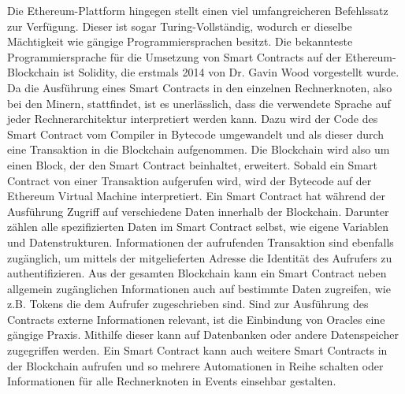 Die Ethereum-Plattform hingegen stellt einen viel umfangreicheren Befehlssatz
zur Verfügung. Dieser ist sogar Turing-Vollständig, wodurch er dieselbe Mächtigkeit wie gängige
Programmiersprachen besitzt.
Die bekannteste Programmiersprache für die Umsetzung von Smart Contracts auf der Ethereum-Blockchain 
ist Solidity, die erstmals 2014 von Dr. Gavin Wood vorgestellt wurde. Da die Ausführung eines Smart Contracts
in den einzelnen Rechnerknoten, also bei den Minern, stattfindet, ist es unerlässlich, 
dass die verwendete Sprache auf jeder Rechnerarchitektur interpretiert werden kann.
Dazu wird der Code des Smart Contract vom Compiler in 
Bytecode umgewandelt und als dieser durch eine Transaktion in die Blockchain 
aufgenommen. %
Die Blockchain wird also um einen Block, der den Smart Contract beinhaltet, erweitert.
Sobald ein Smart Contract von einer Transaktion aufgerufen wird, wird der Bytecode 
auf der Ethereum Virtual Machine interpretiert.
Ein Smart Contract hat während der Ausführung Zugriff auf verschiedene Daten innerhalb der 
Blockchain. 
Darunter zählen alle spezifizierten Daten im Smart Contract selbst, wie eigene Variablen
und Datenstrukturen. Informationen der aufrufenden Transaktion sind ebenfalls zugänglich, um 
mittels der mitgelieferten Adresse die Identität des Aufrufers
zu authentifizieren. Aus der gesamten Blockchain kann ein Smart Contract neben
allgemein zugänglichen Informationen auch auf bestimmte Daten zugreifen, wie z.B. 
Tokens die dem Aufrufer zugeschrieben sind.
Sind zur Ausführung des Contracts externe Informationen relevant, ist die Einbindung von Oracles
eine gängige Praxis. Mithilfe dieser kann auf Datenbanken oder andere Datenspeicher zugegriffen werden.
Ein Smart Contract kann auch weitere Smart Contracts in der Blockchain aufrufen und so 
mehrere Automationen in Reihe schalten oder Informationen für alle Rechnerknoten in Events
einsehbar gestalten.
\cite[p.~57ff]{fill2020blockchain}

